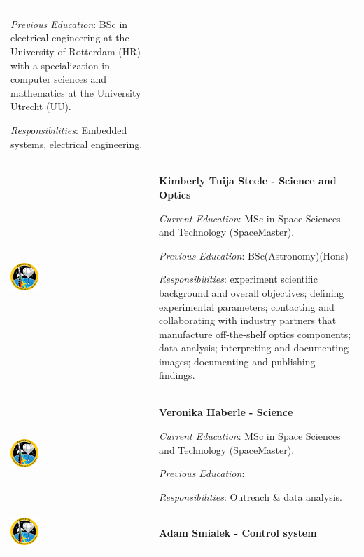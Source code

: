 \begin{longtable}[]{m{} m{}}
\smallskip
\textit{Previous Education}: BSc in electrical engineering at the University of Rotterdam (HR) with a specialization in computer sciences and mathematics at the University Utrecht (UU).

\smallskip
\textit{Responsibilities}: Embedded systems, electrical engineering.
\bigskip
\\

\includegraphics[width=0.2\textwidth]{0-cover/img/logo-rexus-bexus.png}  & \textbf{Kimberly Tuija Steele - Science and Optics}

\smallskip
\textit{Current Education}: MSc in Space Sciences and Technology (SpaceMaster).

\smallskip
\textit{Previous Education}: BSc(Astronomy)(Hons)

\smallskip
\textit{Responsibilities}: experiment scientific background and overall objectives; defining experimental parameters; contacting and collaborating with industry partners that manufacture off-the-shelf optics components; data analysis; interpreting and documenting images; documenting and publishing findings.

\bigskip
\\

\includegraphics[width=0.2\textwidth]{0-cover/img/logo-rexus-bexus.png}  & \textbf{Veronika Haberle - Science}

\smallskip
\textit{Current Education}: MSc in Space Sciences and Technology (SpaceMaster).

\smallskip
\textit{Previous Education}:

\smallskip
\textit{Responsibilities}: Outreach \& data analysis.
\bigskip
\\

\includegraphics[width=0.2\textwidth]{0-cover/img/logo-rexus-bexus.png}  & \textbf{Adam Smialek - Control system}


\end{longtable}
